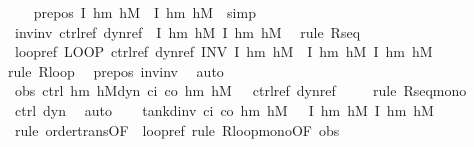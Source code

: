 \documentclass[envcountsame,envcountsect]{llncs}
\begin{document}
\begin{example}
\begin{isabellebody}
\ \ \isamarkupfalse%
\ pre{\isacharunderscore}pos{\isacharcolon}\ {\isachardoublequoteopen}{\isasymlceil}I\ h\isactrlsub m\ h\isactrlsub M{\isasymrceil}\ {\isasymle}\ {\isasymlceil}I\ h\isactrlsub m\ h\isactrlsub M{\isasymrceil}{\isachardoublequoteclose}\ \isamarkupfalse\ simp\isanewline
\ \ \isamarkupfalse%
\ inv{\isacharunderscore}inv{\isacharcolon}\ {\isachardoublequoteopen}{\isacharquery}ctrl{\isacharunderscore}ref{\isacharsemicolon}\ {\isacharquery}dyn{\isacharunderscore}ref\ {\isasymle}\ \isactrlbold {\isacharbrackleft}I\ h\isactrlsub m\ h\isactrlsub M{\isacharcomma}\ I\ h\isactrlsub m\ h\isactrlsub M\isactrlbold {\isacharbrackright}{\isachardoublequoteclose}\ \isamarkupfalse%
\ {\isacharparenleft}rule\ R{\isacharunderscore}seq{\isacharparenright}\isanewline
\ \ \isamarkupfalse%
\ loopref{\isacharcolon}\ {\isachardoublequoteopen}LOOP\ {\isacharquery}ctrl{\isacharunderscore}ref{\isacharsemicolon}\ {\isacharquery}dyn{\isacharunderscore}ref\ INV\ I\ h\isactrlsub m\ h\isactrlsub M\ {\isasymle}\ \isactrlbold {\isacharbrackleft}I\ h\isactrlsub m\ h\isactrlsub M{\isacharcomma}\ I\ h\isactrlsub m\ h\isactrlsub M\isactrlbold {\isacharbrackright}{\isachardoublequoteclose}\isanewline
\ \ \ \ \isamarkupfalse%
{\isacharparenleft}rule\ R{\isacharunderscore}loop{\isacharparenright}\ \isamarkupfalse%
\ pre{\isacharunderscore}pos\ inv{\isacharunderscore}inv\ \isamarkupfalse%
\ auto\isanewline
\ \ \isamarkupfalse%
\ obs{\isacharcolon}\ {\isachardoublequoteopen}{\isacharparenleft}ctrl\ h\isactrlsub m\ h\isactrlsub M{\isacharsemicolon}dyn\ c\isactrlsub i\ c\isactrlsub o\ h\isactrlsub m\ h\isactrlsub M\ {\isasymtau}{\isacharparenright}\ {\isasymle}\ {\isacharquery}ctrl{\isacharunderscore}ref{\isacharsemicolon}\ {\isacharquery}dyn{\isacharunderscore}ref{\isachardoublequoteclose}\isanewline
\ \ \ \ \isamarkupfalse%
{\isacharparenleft}rule\ R{\isacharunderscore}seq{\isacharunderscore}mono{\isacharparenright}\ \isamarkupfalse%
\ ctrl\ dyn\ \isamarkupfalse%
\ auto\isanewline
\ \ \isamarkupfalse%
\ {\isachardoublequoteopen}tank{\isacharunderscore}dinv\ c\isactrlsub i\ c\isactrlsub o\ h\isactrlsub m\ h\isactrlsub M\ {\isasymtau}\ {\isasymle}\ \isactrlbold {\isacharbrackleft}I\ h\isactrlsub m\ h\isactrlsub M{\isacharcomma}\ I\ h\isactrlsub m\ h\isactrlsub M\isactrlbold {\isacharbrackright}{\isachardoublequoteclose}\isanewline
\ \ \ \ \isamarkupfalse%
\ {\isacharparenleft}rule\ order{\isacharunderscore}trans{\isacharbrackleft}OF\ {\isacharunderscore}\ loopref{\isacharbrackright}{\isacharcomma}\ rule\ R{\isacharunderscore}loop{\isacharunderscore}mono{\isacharbrackleft}OF\ obs{\isacharbrackright}{\isacharparenright}\isanewline
{}\isamarkupfalse%
\end{isabellebody}
\end{example}
\end{document}
